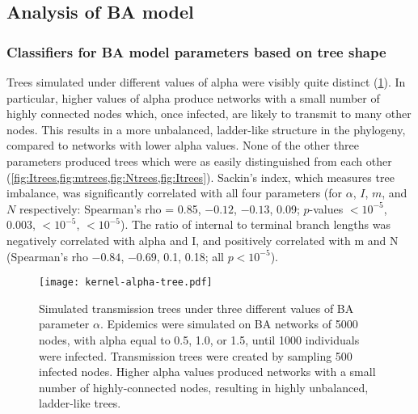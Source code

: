 \subsection{Analysis of \acrlong{BA} model}



\subsubsection*{Classifiers for BA model parameters based on tree shape}



Trees simulated under different values of \gls{alpha} were visibly quite
distinct (\cref{fig:alphatrees}). In particular, higher values of \gls{alpha}
produce networks with a small number of highly connected nodes which, once
infected, are likely to transmit to many other nodes. This results in a more
unbalanced, ladder-like structure in the phylogeny, compared to networks with
lower \gls{alpha} values. None of the other three parameters produced trees
which were as easily distinguished from each other
(\cref{fig:Itrees,fig:mtrees,fig:Ntrees,fig:Itrees}).  Sackin's index, which
measures tree imbalance, was significantly correlated with all four parameters
    (for $\alpha$, $I$, $m$, and $N$ respectively: Spearman's rho =
     0.85,
     \ensuremath{-0.12},
     \ensuremath{-0.13},
     0.09;
     $p$-values
     ${<}10^{-5}$,
     $0.003$,
     ${<}10^{-5}$,
     ${<}10^{-5}$).
The ratio of internal to terminal branch lengths was negatively correlated with
\gls{alpha} and \gls{I}, and positively correlated with \gls{m} and \gls{N}
  (Spearman's rho
    \ensuremath{-0.84},
    \ensuremath{-0.69},
    0.1,
    0.18;
  all $p < 10^{-5}$).

\begin{figure}[ht]
  \centering
  \texttt{[image: kernel-alpha-tree.pdf]}
  \caption[Simulated transmission trees under three different values of BA parameter $\alpha$]{
    Simulated transmission trees under three different values of BA parameter
    $\alpha$. Epidemics were simulated on \gls{BA} networks of 5000 nodes, with
    \gls{alpha} equal to 0.5, 1.0, or 1.5, until 1000 individuals were
    infected. Transmission trees were created by sampling 500 infected nodes.
    Higher \gls{alpha} values produced networks with a small number of
    highly-connected nodes, resulting in highly unbalanced, ladder-like trees.
  }
  \label{fig:alphatrees}
\end{figure}

